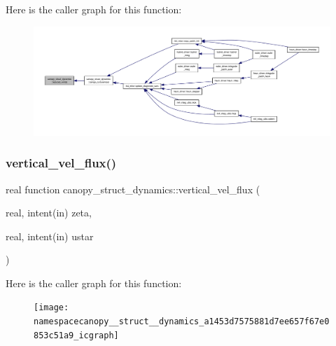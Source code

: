 Here is the caller graph for this function\+:
\nopagebreak
\begin{figure}[H]
\begin{center}
\leavevmode
\includegraphics[width=350pt]{namespacecanopy__struct__dynamics_a4bfef6570fcebda5f22600fd0660ee0c_icgraph}
\end{center}
\end{figure}
\mbox{\label{namespacecanopy__struct__dynamics_a1453d7575881d7ee657f67e0853c51a9}} 
\subsubsection{\texorpdfstring{vertical\+\_\+vel\+\_\+flux()}{vertical\_vel\_flux()}}
{\footnotesize\ttfamily real function canopy\+\_\+struct\+\_\+dynamics\+::vertical\+\_\+vel\+\_\+flux (\begin{DoxyParamCaption}\item[{real, intent(in)}]{zeta,  }\item[{real, intent(in)}]{ustar }\end{DoxyParamCaption})}

Here is the caller graph for this function\+:
\nopagebreak
\begin{figure}[H]
\begin{center}
\leavevmode
\texttt{[image: namespacecanopy\_\_struct\_\_dynamics\_a1453d7575881d7ee657f67e0853c51a9\_icgraph]}
\end{center}
\end{figure}
\mbox{\label{namespacecanopy__struct__dynamics_a2d40fd080c1c03b7c112ff3861e89458}} 
